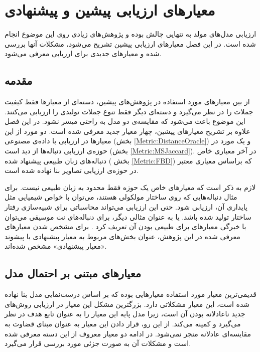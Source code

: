 \chapter{ معیارهای ارزیابی پیشین و پیشنهادی}\label{Chap:Chap4}
\minitoc
ارزیابی مدل‌های مولد به تنهایی چالش بوده و پژوهش‌های زیادی روی این موضوع انجام شده است.
در این فصل معیار‌های ارزیابی پیشین تشریح می‌شود، مشکلات آنها بررسی شده و معیار‌های جدیدی برای ارزیابی  معرفی می‌شود.
\section{مقدمه}
از بین معیار‌های مورد استفاده در پژوهش‌های پیشین، دسته‌ای از معیارها فقط کیفیت جملات را در نظر می‌گیرد و دسته‌ای دیگر فقط تنوع جملات تولیدی را ارزیابی می‌کنند. این موضوع باعث می‌شود که مقایسه‌ی دو مدل به راحتی میسر نشود. در این فصل علاوه بر تشریح معیارهای پیشین، چهار معیار جدید معرفی شده است.  دو مورد از این معیارها در ارزیابی با داده‌ی مصنوعی 
(بخش 
\ref{Metric:DistanceOracle})
و یک مورد در حوزه‌ی ارزیابی دنباله‌ها از دید 
\ngram{} 
 است 
(بخش
  \ref{Metric:MSJaccard}). 
در آخر معیاری خاص دنباله‌های زبان طبیعی پیشنهاد شده (
 بخش
   \ref{Metric:FBD})
 که براساس معیاری معتبر در حوزه‌ی ارزیابی تصاویر بنا نهاده شده است.
 
 
لازم به ذکر است که معیار‌های خاص یک حوزه فقط محدود به زبان طبیعی نیست.
 برای مثال دنباله‌هایی که روی ساختار مولکولی هستند، می‌توان با خواص شیمیایی مثل پایداری آن، ارزیابی شود. حتی این ارزیابی می‌تواند محاسباتی برای شبیه‌سازی رفتار ساختار تولید شده باشد. یا به عنوان مثالی دیگر، برای دنباله‌های نت موسیقی می‌توان با خبرگی معیارهای برای طبیعی بودن آن تعریف کرد
 \cite{ORGAN}.
\newline
برای مشخص شدن معیار‌های معرفی شده در این پژوهش، عنوان بخش‌های مربوط به معیار پیشنهادی با پیشوند «معیار پیشنهادی» مشخص شده‌اند.
\section{معیا‌رهای مبتنی بر احتمال مدل}
قدیمی‌ترین معیار مورد استفاده معیار‌هایی بوده که بر اساس درست‌نمایی مدل بنا نهاده شده است، این معیار‌ مشکلاتی دارد.
بزرگترین مشکل این معیار در ارزیابی روش‌های جدید ناعادلانه بودن آن است، زیرا مدل پایه این معیار را به عنوان تابع هدف در نظر می‌گیرد و کمینه می‌کند. از این  رو، قرار دادن این معیار به عنوان مبنای قضاوت به مقایسه‌ای عادلانه منجر نمی‌شود.
در ادامه دو معیار معروف از این دسته معرفی شده است و مشکلات آن به صورت جزئی مورد بررسی قرار می‌گیرد.
